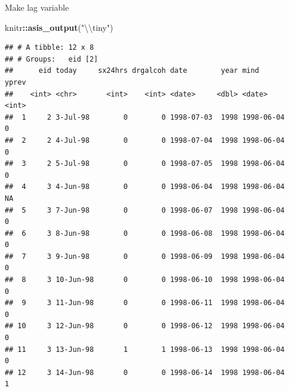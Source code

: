 \documentclass[ignorenonframetext,]{beamer}
\newenvironment{Shaded}{\begin{snugshade}}{\end{snugshade}}
\newcommand{\KeywordTok}[1]{\textcolor[rgb]{0.13,0.29,0.53}{\textbf{#1}}}
\newcommand{\DataTypeTok}[1]{\textcolor[rgb]{0.13,0.29,0.53}{#1}}
\newcommand{\DecValTok}[1]{\textcolor[rgb]{0.00,0.00,0.81}{#1}}
\newcommand{\CharTok}[1]{\textcolor[rgb]{0.31,0.60,0.02}{#1}}
\newcommand{\StringTok}[1]{\textcolor[rgb]{0.31,0.60,0.02}{#1}}
\newcommand{\CommentTok}[1]{\textcolor[rgb]{0.56,0.35,0.01}{\textit{#1}}}
\newcommand{\OperatorTok}[1]{\textcolor[rgb]{0.81,0.36,0.00}{\textbf{#1}}}
\newcommand{\NormalTok}[1]{#1}
\begin{document}
\begin{frame}[fragile]{Make lag variable}

\begin{Shaded}
\begin{Highlighting}[]
\NormalTok{knitr}\OperatorTok{::}\KeywordTok{asis_output}\NormalTok{(}\StringTok{"}\CharTok{\textbackslash{}\textbackslash{}}\StringTok{tiny"}\NormalTok{)}
\end{Highlighting}
\end{Shaded}

\tiny

\begin{Shaded}
\end{Shaded}

\begin{verbatim}
## # A tibble: 12 x 8
## # Groups:   eid [2]
##      eid today     sx24hrs drgalcoh date        year mind       yprev
##    <int> <chr>       <int>    <int> <date>     <dbl> <date>     <int>
##  1     2 3-Jul-98        0        0 1998-07-03  1998 1998-06-04     0
##  2     2 4-Jul-98        0        0 1998-07-04  1998 1998-06-04     0
##  3     2 5-Jul-98        0        0 1998-07-05  1998 1998-06-04     0
##  4     3 4-Jun-98        0        0 1998-06-04  1998 1998-06-04    NA
##  5     3 7-Jun-98        0        0 1998-06-07  1998 1998-06-04     0
##  6     3 8-Jun-98        0        0 1998-06-08  1998 1998-06-04     0
##  7     3 9-Jun-98        0        0 1998-06-09  1998 1998-06-04     0
##  8     3 10-Jun-98       0        0 1998-06-10  1998 1998-06-04     0
##  9     3 11-Jun-98       0        0 1998-06-11  1998 1998-06-04     0
## 10     3 12-Jun-98       0        0 1998-06-12  1998 1998-06-04     0
## 11     3 13-Jun-98       1        1 1998-06-13  1998 1998-06-04     0
## 12     3 14-Jun-98       0        0 1998-06-14  1998 1998-06-04     1
\end{verbatim}

\end{frame}
\end{document}
